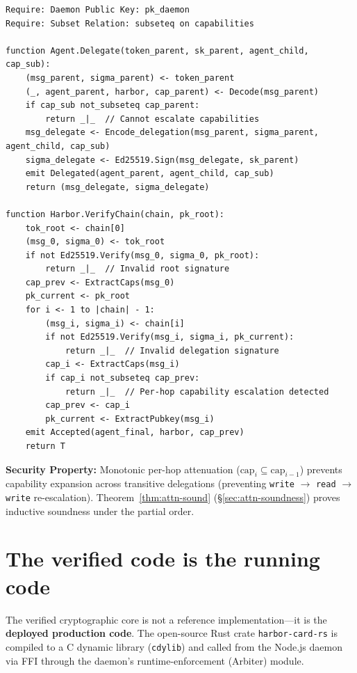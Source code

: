 \documentclass[11pt,a4paper]{article}
\theoremstyle{definition}
\begin{document}
\begin{lstlisting}[caption={Algorithm 3: Delegation Chain Verification},label={alg:delegation}]
Require: Daemon Public Key: pk_daemon
Require: Subset Relation: subseteq on capabilities

function Agent.Delegate(token_parent, sk_parent, agent_child, cap_sub):
    (msg_parent, sigma_parent) <- token_parent
    (_, agent_parent, harbor, cap_parent) <- Decode(msg_parent)
    if cap_sub not_subseteq cap_parent:
        return _|_  // Cannot escalate capabilities
    msg_delegate <- Encode_delegation(msg_parent, sigma_parent, agent_child, cap_sub)
    sigma_delegate <- Ed25519.Sign(msg_delegate, sk_parent)
    emit Delegated(agent_parent, agent_child, cap_sub)
    return (msg_delegate, sigma_delegate)

function Harbor.VerifyChain(chain, pk_root):
    tok_root <- chain[0]
    (msg_0, sigma_0) <- tok_root
    if not Ed25519.Verify(msg_0, sigma_0, pk_root):
        return _|_  // Invalid root signature
    cap_prev <- ExtractCaps(msg_0)
    pk_current <- pk_root
    for i <- 1 to |chain| - 1:
        (msg_i, sigma_i) <- chain[i]
        if not Ed25519.Verify(msg_i, sigma_i, pk_current):
            return _|_  // Invalid delegation signature
        cap_i <- ExtractCaps(msg_i)
        if cap_i not_subseteq cap_prev:
            return _|_  // Per-hop capability escalation detected
        cap_prev <- cap_i
        pk_current <- ExtractPubkey(msg_i)
    emit Accepted(agent_final, harbor, cap_prev)
    return T
\end{lstlisting}

\textbf{Security Property:} Monotonic per-hop attenuation ($\text{cap}_i \subseteq \text{cap}_{i-1}$) prevents capability expansion across transitive delegations (preventing \texttt{write} $\to$ \texttt{read} $\to$ \texttt{write} re-escalation). Theorem~\ref{thm:attn-sound} (\S\ref{sec:attn-soundness}) proves inductive soundness under the partial order.

\section{The verified code is the running code}\label{sec:implementation}

The verified cryptographic core is not a reference implementation---it is the \textbf{deployed production code}. The open-source Rust crate \texttt{harbor-card-rs} is compiled to a C dynamic library (\texttt{cdylib}) and called from the Node.js daemon via FFI through the daemon's runtime-enforcement (Arbiter) module.
\end{document}

